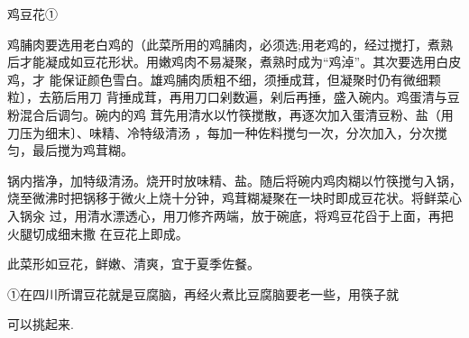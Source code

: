 \begin{recipe}{鸡豆花①}

\ingredients


\cooking

\step 鸡脯肉要选用老白鸡的（此菜所用的鸡脯肉，必须选;用老鸡的，经过搅打，煮熟
后才能凝成如豆花形状。用嫩鸡肉不易凝聚，煮熟时成为“鸡淖”。其次要选用白皮鸡，才
能保证颜色雪白。雄鸡脯肉质粗不细，须捶成茸，但凝聚时仍有微细颗粒〕，去筋后用刀
背捶成茸，再用刀口剁数遍，剁后再捶，盛入碗内。鸡蛋清与豆粉混合后调匀。碗内的鸡
茸先用清水以竹筷搅散，再逐次加入蛋清豆粉、盐（用刀压为细末〕、味精、冷特级清汤
，每加一种佐料搅匀一次，分次加入，分次搅匀，最后搅为鸡茸糊。

\step 锅内揩净，加特级清汤。烧开时放味精、盐。随后将碗内鸡肉糊以竹筷搅勻入锅，
烧至微沸时把锅移于微火上烧十分钟，鸡茸糊凝聚在一块时即成豆花状。将鲜菜心入锅汆
过，用清水漂透心，用刀修齐两端，放于碗底，将鸡豆花舀于上面，再把火腿切成细末撒
在豆花上即成。

\notes

此菜形如豆花，鲜嫩、清爽，宜于夏季佐餐。

①在四川所谓豆花就是豆腐脑，再经火煮比豆腐脑要老一些，用筷子就

可以挑起来.

\end{recipe}


